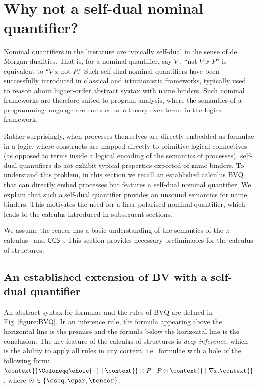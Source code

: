 \documentclass[UKenglish,acmsmall,authorversion]{acmart}
\theoremstyle{plain}
\begin{document}
\section{Why not a self-dual nominal quantifier?}
\label{section:self-dual}

Nominal quantifiers in the literature are typically self-dual in the sense of de Morgan dualities.
That is, for a nominal quantifier, say $\nabla$, ``not $\nabla x$ $P$'' is equivalent to ``$\nabla x$ not $P$.''
Such self-dual nominal quantifiers have been successfully introduced in classical and intuitionistic frameworks, typically used to reason about higher-order abstract syntax with name binders.
Such nominal frameworks are therefore suited to program analysis, where the semantics of a programming language are encoded as a theory over terms in the logical framework.

Rather surprisingly, when processes themselves are directly embedded as formulae in a logic, where constructs are mapped directly to primitive logical connectives 
(as opposed to terms inside a logical encoding of the semantics of processes),
self-dual quantifiers do not exhibit typical properties expected of name binders.
To understand this problem, in this section we recall an established calculus \textsf{BVQ}~\cite{Roversi14} that can directly embed processes but features a self-dual nominal quantifier.
We explain that such a self-dual quantifier provides an unsound semantics for name binders.
This motivates the need for a finer polarised nominal quantifier, which leads to the calculus introduced in subsequent sections.

We assume the reader has a basic understanding of 
the semantics of the $\pi$-calculus~\cite{Milner1992} and $\textsf{CCS}$~\cite{Milner1982}.
This section provides necessary preliminaries for the calculus of structures.

\subsection{An established extension of \textsf{BV} with a self-dual quantifier}

An abstract syntax for formulae and the rules of \textsf{BVQ} are defined in Fig~\ref{figure:BVQ}.
In an inference rule, the formula appearing above the horizontal line is the premise and the formula below the horizontal line is the conclusion.
The key feature of the calculus of structures is \textit{deep inference}, which is the ability to apply
all rules in any context, i.e.\ formulae with a hole of the following form: $\context{} \Coloneqq \ehole{\,\cdot\,} \mid \context{} \odot P \mid P \odot \context{} \mid \nabla x . \context{}$, 
where $\odot \in \left\{ \cseq, \cpar, \tensor \right\}$.
\end{document}
